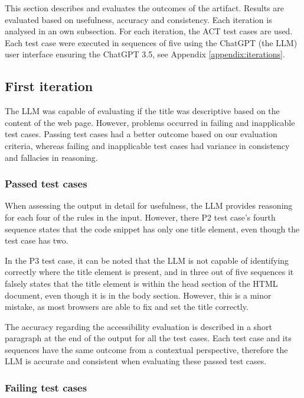 This section describes and evaluates the outcomes of the artifact. Results are evaluated based on usefulness, accuracy and consistency. Each iteration is analysed in an own subsection. For each iteration, the \textcite{act_rule_g88} ACT test cases are used. Each test case were executed in sequences of five using the ChatGPT (the LLM) user interface ensuring the ChatGPT 3.5, see Appendix \ref{appendix:iterations}.

\subsection{First iteration}

The LLM was capable of evaluating if the title was descriptive based on the content of the web page. However, problems occurred in failing and inapplicable test cases. Passing test cases had a better outcome based on our evaluation criteria, whereas failing and inapplicable test cases had variance in consistency and fallacies in reasoning.

\subsubsection{Passed test cases}

When assessing the output in detail for usefulness, the LLM provides reasoning for each four of the rules in the input. However, there P2 test case's fourth sequence states that the code snippet has only one title element, even though the test case has two. 

In the P3 test case, it can be noted that the LLM is not capable of identifying correctly where the title element is present, and in three out of five sequences it falsely states that the title element is within the head section of the HTML document, even though it is in the body section. However, this is a minor mistake, as most browsers are able to fix and set the title correctly.

The accuracy regarding the accessibility evaluation is described in a short paragraph at the end of the output for all the test cases. Each test case and its sequences have the same outcome from a contextual perspective, therefore the LLM is accurate and consistent when evaluating these passed test cases.

\subsubsection{Failing test cases}

